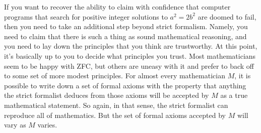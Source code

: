 \documentclass[12pt,letterpaper]{book}
\begin{document}
If you want to recover the ability to claim with confidence that computer programs that search for positive integer solutions to $a^2 = 2b^2$ are doomed to fail, then you need to take an additional step beyond strict formalism.  Namely, you need to claim that there is such a thing as sound mathematical reasoning, and you need to lay down the principles that you think are trustworthy.  At this point, it's basically up to you to decide what principles you trust. Most mathematicians seem to be happy with ZFC, but others are uneasy with it and prefer to back off to some set of more modest principles. For almost every mathematician $M$, it is possible to write down a set of formal axioms with the property that anything the strict formalist deduces from those axioms will be accepted by $M$ as a true mathematical statement.  So again, in that sense, the strict formalist can reproduce all of mathematics.  But the set of formal axioms accepted by $M$ will vary as $M$ varies.
\end{document}
